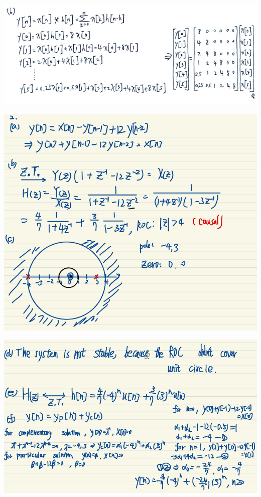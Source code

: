 \documentclass[a4paper]{article}
\begin{document}
	\begin{center}
		\includegraphics[width=1\linewidth]{screenshot124}
	\end{center}
	
	\begin{center}
		\includegraphics[width=1\linewidth]{screenshot125}
	\end{center}
	\begin{center}
		\includegraphics[width=1\linewidth]{screenshot126}
	\end{center}
	
\end{document}
